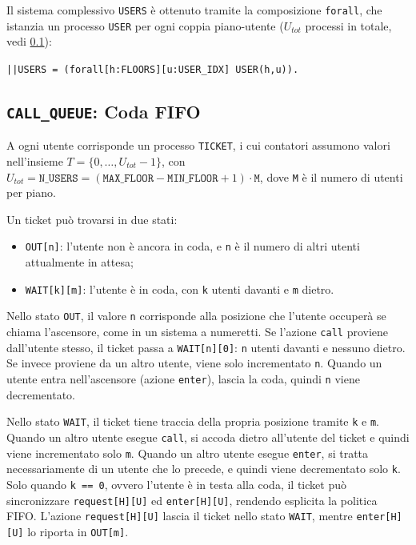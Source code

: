 Il sistema complessivo \texttt{USERS} è ottenuto tramite la composizione \texttt{forall}, che istanzia un processo \texttt{USER} per ogni coppia piano-utente ($U_{tot}$ processi in totale, vedi
\cref{subsec:call_queue}):
\begin{center}
  \texttt{||USERS = (forall[h:FLOORS][u:USER\_IDX] USER(h,u)).}
\end{center}

\subsection{\texttt{CALL\_QUEUE}: Coda FIFO}
\label{subsec:call_queue}
A ogni utente corrisponde un processo \texttt{TICKET}, i cui contatori assumono valori nell'insieme $T = \{0, \dots, U_{tot}-1\}$, con $U_{tot} = \texttt{N\_USERS} = (\texttt{MAX\_FLOOR} - \texttt{MIN\_FLOOR} + 1) \cdot \texttt{M}$, dove \texttt{M} è il numero di utenti per piano.

Un ticket può trovarsi in due stati:
\begin{itemize}
  \item \texttt{OUT[n]}: l'utente non è ancora in coda, e \texttt{n}
    è il numero di altri utenti attualmente in attesa;
  \item \texttt{WAIT[k][m]}: l'utente è in coda, con \texttt{k}
    utenti davanti e \texttt{m} dietro.
\end{itemize}

Nello stato \texttt{OUT}, il valore \texttt{n} corrisponde alla posizione che l'utente occuperà se chiama l'ascensore, come in un sistema a numeretti.
Se l'azione \texttt{call} proviene dall'utente stesso, il ticket passa a \texttt{WAIT[n][0]}: \texttt{n} utenti davanti e nessuno dietro.
Se invece proviene da un altro utente, viene solo incrementato \texttt{n}.
Quando un utente entra nell'ascensore (azione \texttt{enter}), lascia la coda, quindi \texttt{n} viene decrementato.

Nello stato \texttt{WAIT}, il ticket tiene traccia della propria posizione tramite \texttt{k} e \texttt{m}.
Quando un altro utente esegue \texttt{call}, si accoda dietro all'utente del ticket e quindi viene incrementato solo \texttt{m}.
Quando un altro utente esegue \texttt{enter}, si tratta necessariamente di un utente che lo precede, e quindi viene decrementato solo \texttt{k}.
Solo quando \texttt{k == 0}, ovvero l'utente è in testa alla coda, il ticket può sincronizzare \texttt{request[H][U]} ed \texttt{enter[H][U]}, rendendo esplicita la politica FIFO.
L'azione \texttt{request[H][U]} lascia il ticket nello stato \texttt{WAIT}, mentre \texttt{enter[H][U]} lo riporta in \texttt{OUT[m]}.


